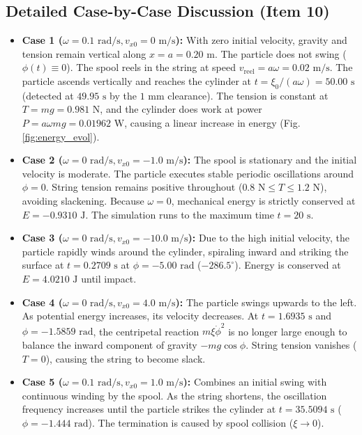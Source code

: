 \documentclass[11pt,a4paper]{article}
\begin{document}
\subsection{Detailed Case-by-Case Discussion (Item 10)}
\begin{itemize}
    \item \textbf{Case 1 ($\omega = 0.1\text{ rad/s}, v_{x0} = 0\text{ m/s}$):} With zero initial velocity, gravity and tension remain vertical along $x = a = 0.20\text{ m}$. The particle does not swing ($\phi(t) \equiv 0$). The spool reels in the string at speed $v_{\text{reel}} = a\omega = 0.02\text{ m/s}$. The particle ascends vertically and reaches the cylinder at $t = \xi_0 / (a\omega) = 50.00\text{ s}$ (detected at $49.95\text{ s}$ by the $1\text{ mm}$ clearance). The tension is constant at $T = mg = 0.981\text{ N}$, and the cylinder does work at power $P = a\omega mg = 0.01962\text{ W}$, causing a linear increase in energy (Fig. \ref{fig:energy_evol}).
    \item \textbf{Case 2 ($\omega = 0\text{ rad/s}, v_{x0} = -1.0\text{ m/s}$):} The spool is stationary and the initial velocity is moderate. The particle executes stable periodic oscillations around $\phi = 0$. String tension remains positive throughout ($0.8\text{ N} \le T \le 1.2\text{ N}$), avoiding slackening. Because $\omega = 0$, mechanical energy is strictly conserved at $E = -0.9310\text{ J}$. The simulation runs to the maximum time $t = 20\text{ s}$.
    \item \textbf{Case 3 ($\omega = 0\text{ rad/s}, v_{x0} = -10.0\text{ m/s}$):} Due to the high initial velocity, the particle rapidly winds around the cylinder, spiraling inward and striking the surface at $t = 0.2709\text{ s}$ at $\phi = -5.00\text{ rad}$ ($-286.5^\circ$). Energy is conserved at $E = 4.0210\text{ J}$ until impact.
    \item \textbf{Case 4 ($\omega = 0\text{ rad/s}, v_{x0} = 4.0\text{ m/s}$):} The particle swings upwards to the left. As potential energy increases, its velocity decreases. At $t = 1.6935\text{ s}$ and $\phi = -1.5859\text{ rad}$, the centripetal reaction $m\xi\dot{\phi}^2$ is no longer large enough to balance the inward component of gravity $-mg\cos\phi$. String tension vanishes ($T = 0$), causing the string to become slack.
    \item \textbf{Case 5 ($\omega = 0.1\text{ rad/s}, v_{x0} = 1.0\text{ m/s}$):} Combines an initial swing with continuous winding by the spool. As the string shortens, the oscillation frequency increases until the particle strikes the cylinder at $t = 35.5094\text{ s}$ ($\phi = -1.444\text{ rad}$). The termination is caused by spool collision ($\xi \to 0$).
\end{itemize}
\end{document}

